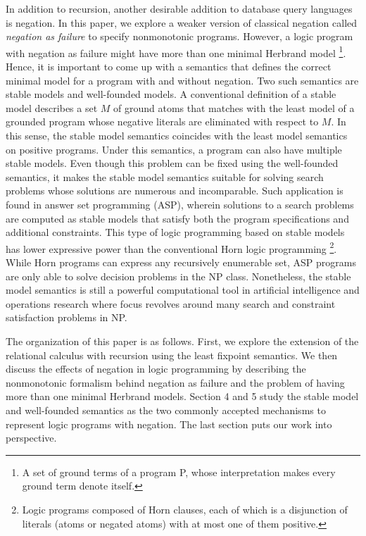 In addition to recursion, another desirable addition to database query languages 
is negation. In this paper, we explore a weaker version of classical negation called 
\emph{negation as failure} to specify nonmonotonic programs. However, a logic 
program with negation as failure might have more than one minimal Herbrand model 
\footnote{A set of ground terms of a program P, whose interpretation 
makes every ground term denote itself.}. Hence, it is important 
to come up with a semantics that defines the correct minimal 
model for a program with and without negation. Two such semantics 
are stable models and well-founded models. A conventional 
definition of a stable model
describes a set $M$ of ground atoms that matches with the least model 
of a grounded program whose negative literals are eliminated with respect to 
$M$. In this sense, the stable model semantics coincides with 
the least model semantics on positive programs. Under this 
semantics, a program can also have multiple stable models. Even though 
this problem can be fixed using the well-founded semantics, 
it makes the stable model semantics suitable for solving search 
problems whose solutions are numerous and incomparable. Such 
application is found in answer set programming (ASP), wherein 
solutions to a search problems are computed as stable models 
that satisfy both the program specifications and additional constraints. 
This type of logic programming based on stable models has lower 
expressive power than the conventional Horn logic programming 
\footnote{Logic programs composed of Horn clauses, 
each of which is a disjunction of literals (atoms or negated atoms) with at most one of 
them positive.}. While Horn programs can express any recursively enumerable set, 
ASP programs are only able to solve decision problems in the NP class. 
Nonetheless, the stable model semantics is still 
a powerful computational tool in artificial 
intelligence and operations research where focus 
revolves around many search and constraint satisfaction 
problems in NP.

The organization of this paper is as follows. First, we 
explore the extension of the relational calculus with recursion 
using the least fixpoint semantics. We then discuss the effects 
of negation in logic programming by describing the nonmonotonic 
formalism behind negation as failure and the problem of 
having more than one minimal Herbrand models. Section 4 and 5 
study the stable model and well-founded semantics as the two 
commonly accepted mechanisms to represent logic programs with 
negation. The last section puts our work into perspective.